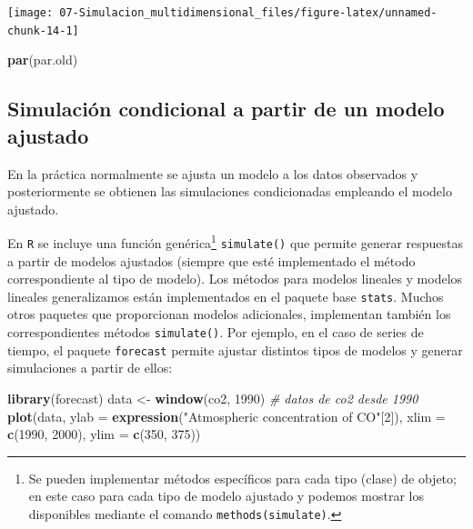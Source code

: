 \documentclass[
]{book}
\newenvironment{Shaded}{\begin{snugshade}}{\end{snugshade}}
\newcommand{\CommentTok}[1]{\textcolor[rgb]{0.56,0.35,0.01}{\textit{#1}}}
\newcommand{\DataTypeTok}[1]{\textcolor[rgb]{0.13,0.29,0.53}{#1}}
\newcommand{\DecValTok}[1]{\textcolor[rgb]{0.00,0.00,0.81}{#1}}
\newcommand{\KeywordTok}[1]{\textcolor[rgb]{0.13,0.29,0.53}{\textbf{#1}}}
\newcommand{\NormalTok}[1]{#1}
\newcommand{\StringTok}[1]{\textcolor[rgb]{0.31,0.60,0.02}{#1}}
\theoremstyle{break}
\theoremstyle{definition}
\theoremstyle{definition}
\theoremstyle{definition}
\theoremstyle{remark}
\begin{document}
\begin{center}\texttt{[image: 07-Simulacion\_multidimensional\_files/figure-latex/unnamed-chunk-14-1]} \end{center}

\begin{Shaded}
\begin{Highlighting}[]
\KeywordTok{par}\NormalTok{(par.old)}
\end{Highlighting}
\end{Shaded}

\hypertarget{simulaciuxf3n-condicional-a-partir-de-un-modelo-ajustado}{%
\subsection{Simulación condicional a partir de un modelo ajustado}\label{simulaciuxf3n-condicional-a-partir-de-un-modelo-ajustado}}

En la práctica normalmente se ajusta un modelo a los datos observados y posteriormente se obtienen las simulaciones condicionadas empleando el modelo ajustado.

En \texttt{R} se incluye una función genérica\footnote{Se pueden implementar métodos específicos para cada tipo (clase) de objeto; en este caso para cada tipo de modelo ajustado y podemos mostrar los disponibles mediante el comando \texttt{methods(simulate)}.} \texttt{simulate()} que permite generar respuestas a partir de modelos ajustados (siempre que esté implementado el método correspondiente al tipo de modelo).
Los métodos para modelos lineales y modelos lineales generalizamos están implementados en el paquete base \texttt{stats}.
Muchos otros paquetes que proporcionan modelos adicionales, implementan también los correspondientes métodos \texttt{simulate()}.
Por ejemplo, en el caso de series de tiempo, el paquete \texttt{forecast} permite ajustar distintos tipos de modelos y generar simulaciones a partir de ellos:

\begin{Shaded}
\begin{Highlighting}[]
\KeywordTok{library}\NormalTok{(forecast)}
\NormalTok{data <-}\StringTok{ }\KeywordTok{window}\NormalTok{(co2, }\DecValTok{1990}\NormalTok{) }\CommentTok{# datos de co2 desde 1990}
\KeywordTok{plot}\NormalTok{(data, }\DataTypeTok{ylab =} \KeywordTok{expression}\NormalTok{(}\StringTok{"Atmospheric concentration of CO"}\NormalTok{[}\DecValTok{2}\NormalTok{]),}
     \DataTypeTok{xlim =} \KeywordTok{c}\NormalTok{(}\DecValTok{1990}\NormalTok{, }\DecValTok{2000}\NormalTok{), }\DataTypeTok{ylim =} \KeywordTok{c}\NormalTok{(}\DecValTok{350}\NormalTok{, }\DecValTok{375}\NormalTok{))}
\end{Highlighting}
\end{Shaded}
\end{document}

